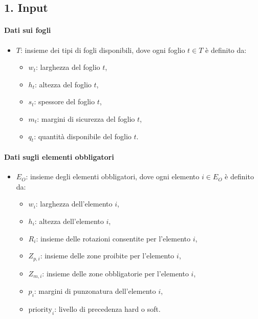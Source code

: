 \subsection*{1. Input}

\paragraph*{Dati sui fogli}  
\begin{itemize}
    \item \( T \): insieme dei tipi di fogli disponibili, dove ogni foglio \( t \in T \) è definito da:
    \begin{itemize}
        \item \( w_t \): larghezza del foglio \( t \),
        \item \( h_t \): altezza del foglio \( t \),
        \item \( s_t \): spessore del foglio \( t \),
        \item \( m_t \): margini di sicurezza del foglio \( t \),
        \item \( q_t \): quantità disponibile del foglio \( t \).
    \end{itemize}
\end{itemize}

\paragraph*{Dati sugli elementi obbligatori}  
\begin{itemize}
    \item \( E_O \): insieme degli elementi obbligatori, dove ogni elemento \( i \in E_O \) è definito da:
    \begin{itemize}
        \item \( w_i \): larghezza dell’elemento \( i \),
        \item \( h_i \): altezza dell’elemento \( i \),
        \item \( R_i \): insieme delle rotazioni consentite per l’elemento \( i \),
        \item \( Z_{p,i} \): insieme delle zone proibite per l’elemento \( i \),
        \item \( Z_{m,i} \): insieme delle zone obbligatorie per l’elemento \( i \),
        \item \( p_i \): margini di punzonatura dell’elemento \( i \),
        \item \( \text{priority}_i \): livello di precedenza hard o soft.
    \end{itemize}
\end{itemize}

